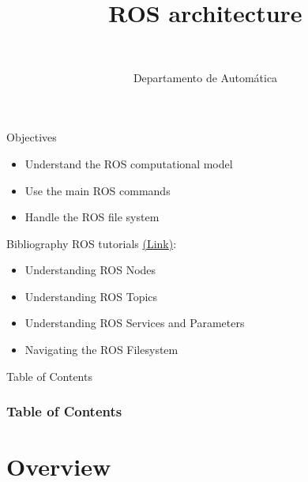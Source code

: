 \documentclass[10pt,compress]{beamer} %
\title[ROS architecture]{ROS architecture}
\author{\asignatura\\\carrera}
\institute{}
\date{Departamento de Automática}
\begin{document}
{\titlepageBlue
    \begin{frame}
        \titlepage
    \end{frame}
}

\begin{frame}[plain]{}
   \begin{block}{Objectives}
       \begin{itemize}
        \item Understand the ROS computational model
        \item Use the main ROS commands
	\item Handle the ROS file system
       \end{itemize}
   \end{block}

   \begin{block}{Bibliography}
       ROS tutorials \href{http://wiki.ros.org/ROS/Tutorials}{(Link)}: 
	\begin{itemize}
	\item Understanding ROS Nodes
	\item Understanding ROS Topics
	\item Understanding ROS Services and Parameters
	\item Navigating the ROS Filesystem
	\end{itemize}
   \end{block}

\end{frame}

{
\begin{frame}[shrink]{Table of Contents}
 \frametitle{Table of Contents}
 \tableofcontents
\end{frame}
}

\section{Overview}
\end{document}
